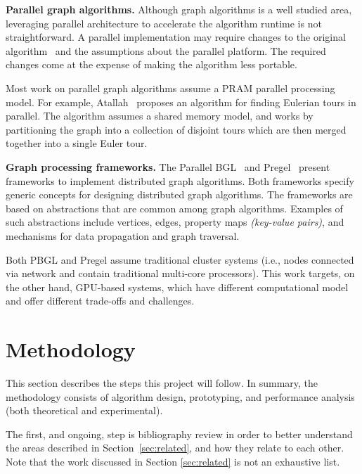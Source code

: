 \documentclass{acm_proc_article-sp}[12pt]
\begin{document}
{\bf Parallel graph algorithms.} Although graph algorithms is a well studied area, leveraging parallel architecture to accelerate the algorithm runtime is not straightforward. A parallel implementation may require changes to the original algorithm~\cite{Quinn1984,Atallah1984} and the assumptions about the parallel platform. The required changes come at the expense of making the algorithm less portable.

Most work on parallel graph algorithms assume a PRAM parallel processing model.  For example, Atallah~\cite{Atallah1984} proposes an algorithm for finding Eulerian tours in parallel. The algorithm assumes a shared memory model, and works by partitioning the graph into a collection of disjoint tours which are then merged together into a single Euler tour.


{\bf Graph processing frameworks.} The Parallel BGL~\cite{gregor2005parallel} and Pregel~\cite{Malewicz2009} present frameworks to implement distributed graph algorithms. Both frameworks specify generic concepts for designing distributed graph algorithms. The frameworks are based on abstractions that are common among graph algorithms. Examples of such abstractions include vertices, edges, property maps {\em (key-value pairs)}, and mechanisms for data propagation and graph traversal. 

Both PBGL and Pregel assume traditional cluster systems (i.e., nodes connected via network and contain traditional multi-core processors). This work targets, on the other hand, GPU-based systems, which have different computational model and offer different trade-offs and challenges.



\section{Methodology}
\label{sec:methodology}
This section describes the steps this project will follow. In summary, the methodology consists of algorithm design, prototyping, and performance analysis (both theoretical and experimental).

The first, and ongoing, step is bibliography review in order to better understand the areas described in Section~\ref{sec:related}, and how they relate to each other. Note that the work discussed in Section \ref{sec:related} is not an exhaustive list. 
\end{document}
